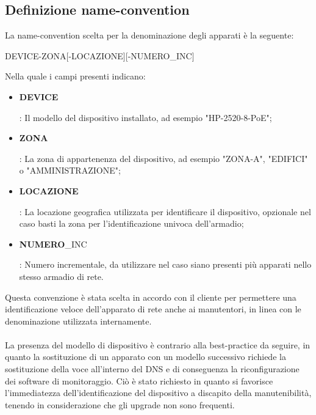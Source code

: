 \documentclass[Realizzazione.tex]{subfiles}
\begin{document}
\newpage
\subsection{Definizione name-convention}
La name-convention scelta per la denominazione degli apparati è la seguente:\\
{ \centering
	\begin{ttfamily}
		\large DEVICE-ZONA[-LOCAZIONE][-NUMERO\_INC]\\
	\end{ttfamily}
}
\medskip
Nella quale i campi presenti indicano: 
\begin{itemize}
	\item  \begin{ttfamily}\textbf{DEVICE}\end{ttfamily}: Il modello del dispositivo installato, ad esempio "HP-2520-8-PoE";
	\item  \begin{ttfamily}\textbf{ZONA}\end{ttfamily}: La zona di appartenenza del dispositivo, ad esempio "ZONA-A", "EDIFICI" o "AMMINISTRAZIONE";
	\item  \begin{ttfamily}\textbf{LOCAZIONE}\end{ttfamily}: La locazione geografica utilizzata per identificare il dispositivo, opzionale nel caso basti la zona per l'identificazione univoca dell'armadio;
	\item  \begin{ttfamily}\textbf{NUMERO}\_INC\end{ttfamily}: Numero incrementale, da utilizzare nel caso siano presenti più apparati nello stesso armadio di rete.
\end{itemize}

Questa convenzione è stata scelta in accordo con il cliente per permettere una identificazione veloce dell'apparato di rete anche ai manutentori, in linea con le denominazione utilizzata internamente. \\\\
La presenza del modello di dispositivo è contrario alla best-practice da seguire, in quanto la sostituzione di un apparato con un modello successivo richiede la sostituzione della voce all'interno del DNS e di conseguenza la riconfigurazione dei software di monitoraggio. Ciò è stato richiesto in quanto si favorisce l'immediatezza dell'identificazione del dispositivo a discapito della manutenibilità, tenendo in considerazione che gli upgrade non sono frequenti. \\
\end{document}
